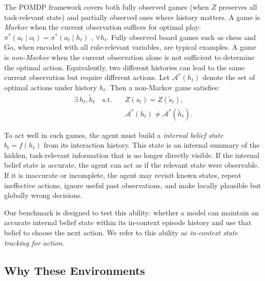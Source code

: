 \documentclass{llmxive}
\begin{document}
The POMDP framework covers both fully observed games (when $Z$ preserves all task-relevant state) and partially observed ones where history matters. A game is \emph{Markov} when the current observation suffices for optimal play: $\pi^*(a_t\mid o_t)=\pi^*(a_t\mid h_t)$ , $\forall h_t$. Fully observed board games such as chess and Go, when encoded with all rule-relevant variables, are typical examples. A game is \emph{non-Markov} when the current observation alone  is not sufficient to determine the optimal action. Equivalently, two different histories can lead to the same current observation but require different actions. Let $\mathcal{A}^*(h_t)$ denote the set of optimal actions under history $h_t$. Then a non-Markov game satisfies:
\vspace{-5pt}
\begin{equation}
\label{eq:non_markov}
\begin{split}
\exists\, h_t, \tilde{h}_t \quad \text{s.t.} \quad
& Z(s_t) = Z(\tilde{s}_t), \\
& \mathcal{A}^*(h_t) \neq \mathcal{A}^*(\tilde{h}_t).
\end{split}
\end{equation}
\vspace{-1em}

To act well in such games, the agent must build a \emph{internal belief state} $b_t=f(h_t)$ from its interaction history. This state is an internal summary of the hidden, task-relevant information that is no longer directly visible. If the internal belief state is accurate, the agent can act as if the relevant state were observable. If it is inaccurate or incomplete, the agent may revisit known states, repeat ineffective actions, ignore useful past observations, and make locally plausible but globally wrong decisions.

Our benchmark is designed to test this ability: whether a model can maintain an accurate internal belief state within its in-context episode history and use that belief to choose the next action. We refer to this ability as \emph{in-context state tracking for action}.

\subsection{Why These Environments}
\label{sec:why_environments}
\end{document}
